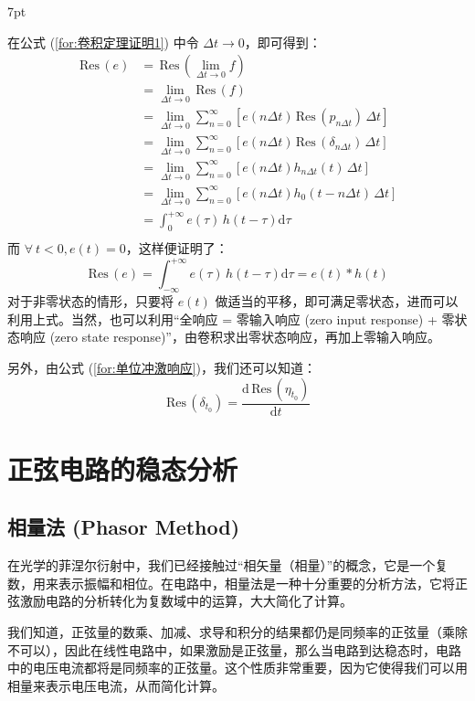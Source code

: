 \documentclass[UTF8]{report}
\def\Res{\,\mathrm{Res}\,}
\theoremstyle{MyLineTheoremStyle} %
\theoremstyle{MyBlockTheoremStyle} %
\theoremstyle{MySubsubsectionStyle} %
\newenvironment{graybox}{%
        \def\FrameCommand{%
        \hspace{1pt}%
        {\color{gray}\small \vrule width 2pt}%
        {\color{graybox_color}\vrule width 4pt}%
        \colorbox{graybox_color}%
        }%
        \MakeFramed{\advance\hsize-\width\FrameRestore}%
        \noindent\hspace{-4.55pt}%
        \begin{adjustwidth}{}{7pt}%
        \vspace{2pt}\vspace{2pt}%
        }
        {%
        \vspace{2pt}\end{adjustwidth}\endMakeFramed%
        }
\begin{document}
\begin{graybox}
在公式 (\ref{for:卷积定理证明1}) 中令 $\Delta t \to 0$，即可得到：
\begin{align}
\Res (e) &= \Res (\lim_{\Delta t \to 0} f) \\ 
&= \lim_{\Delta t \to 0} \Res (f) \\
&= \lim_{\Delta t \to 0} \sum_{n=0}^{\infty} \left[ e(n \Delta t) \Res (p_{n\Delta t}) \, \Delta t\right] \\
&= \lim_{\Delta t \to 0} \sum_{n=0}^{\infty} \left[ e(n \Delta t) \Res ( \delta_{n\Delta t} ) \, \Delta t\right] \\ 
&= \lim_{\Delta t \to 0} \sum_{n=0}^{\infty} \left[ e(n \Delta t) h_{n\Delta t}(t) \, \Delta t\right] \\ 
&= \lim_{\Delta t \to 0} \sum_{n=0}^{\infty} \left[ e(n \Delta t) h_{0}(t - n\Delta t) \, \Delta t\right] \\ 
&= \int_{0}^{+\infty} e(\tau)\, h(t - \tau)\mathrm{d}\tau \\ 
\end{align}
而 $\forall\ t<0, e(t) = 0$，这样便证明了：
\begin{equation}
\Res (e) = \int_{-\infty}^{+\infty} e(\tau)\, h(t - \tau)\mathrm{d}\tau = e(t)*h(t)
\end{equation}
对于非零状态的情形，只要将 $e(t)$ 做适当的平移，即可满足零状态，进而可以利用上式。当然，也可以利用“全响应 = 零输入响应 (zero input response) + 零状态响应 (zero state response)”，由卷积求出零状态响应，再加上零输入响应。
\end{graybox}

另外，由公式 (\ref{for:单位冲激响应})，我们还可以知道：
\begin{equation}
\Res(\delta_{t_0}) = \frac{\mathrm{d} \Res(\eta_{t_0})}{\mathrm{d} t}
\end{equation}

\chapter{正弦电路的稳态分析}\thispagestyle{fancy}

\section{相量法 (Phasor Method)}
在光学的菲涅尔衍射中，我们已经接触过“相矢量（相量）”的概念，它是一个复数，用来表示振幅和相位。在电路中，相量法是一种十分重要的分析方法，它将正弦激励电路的分析转化为复数域中的运算，大大简化了计算。

我们知道，正弦量的数乘、加减、求导和积分的结果都仍是同频率的正弦量（乘除不可以），因此在线性电路中，如果激励是正弦量，那么当电路到达稳态时，电路中的电压电流都将是同频率的正弦量。这个性质非常重要，因为它使得我们可以用相量来表示电压电流，从而简化计算。
\end{document}

